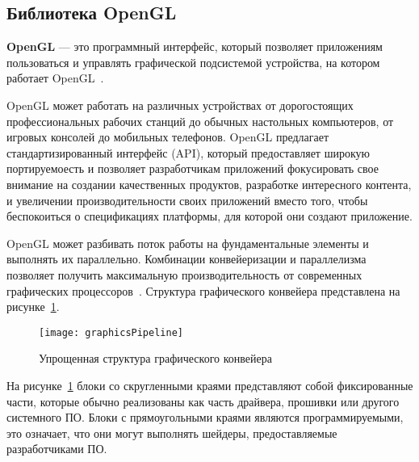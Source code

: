 \subsection{Библиотека OpenGL}

\textbf{OpenGL} --- это программный интерфейс, который позволяет приложениям
пользоваться и управлять графической подсистемой устройства, на котором работает
OpenGL~\cite{OGLSuperbible}.

OpenGL может работать на различных устройствах от дорогостоящих профессиональных
рабочих станций до обычных настольных компьютеров, от игровых консолей до
мобильных телефонов. OpenGL предлагает стандартизированный интерфейс (API),
который предоставляет широкую портируемоесть и позволяет разработчикам
приложений фокусировать свое внимание на создании качественных продуктов,
разработке интересного контента, и увеличении производительности своих
приложений вместо того, чтобы беспокоиться о спецификациях платформы, для
которой они создают приложение.

OpenGL может разбивать поток работы на фундаментальные элементы и выполнять их
параллельно. Комбинации конвейеризации и параллелизма позволяет получить
максимальную производительность от современных графических
процессоров~\cite{OGLSuperbible}.  Структура графического конвейера представлена
на рисунке~\ref{fig:graphicsPipeline}.
\begin{figure}[htb]
	\centering
	\texttt{[image: graphicsPipeline]}
	\caption{Упрощенная структура графического конвейера}%
    \label{fig:graphicsPipeline}
\end{figure}
На рисунке~\ref{fig:graphicsPipeline} блоки со скругленными краями представляют
собой фиксированные части, которые обычно реализованы как часть драйвера,
прошивки или другого системного ПО. Блоки с прямоугольными краями являются
программируемыми, это означает, что они могут выполнять шейдеры, предоставляемые
разработчиками ПО.

